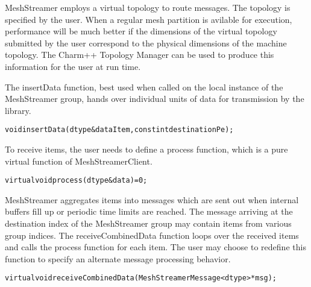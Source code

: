 MeshStreamer employs a virtual topology to route messages. The
topology is specified by the user. When a regular mesh partition is
avilable for execution, performance will be much better if the
dimensions of the virtual topology submitted by the user correspond to
the physical dimensions of the machine topology. The Charm++ Topology
Manager can be used to produce this information for the user at run
time. 

The insertData function, best used when called on the local instance
of the MeshStreamer group, hands over individual units of data for
transmission by the library. 

\begin{alltt}
void insertData(dtype &dataItem, const int destinationPe); 
\end{alltt}

To receive items, the user needs to define a process function, which
is a pure virtual function of MeshStreamerClient.

\begin{alltt}
virtual void process(dtype &data)=0; 
\end{alltt}

MeshStreamer aggregates items into messages which are sent out when
internal buffers fill up or periodic time limits are reached. The
message arriving at the destination index of the MeshStreamer group
may contain items from various group indices. The receiveCombinedData
function loops over the received items and calls the process function
for each item. The user may choose to redefine this function to
specify an alternate message processing behavior. 

\begin{alltt}
virtual void receiveCombinedData(MeshStreamerMessage<dtype> *msg);
\end{alltt}

